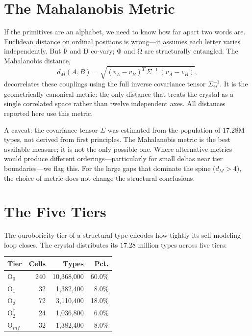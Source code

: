 \documentclass[12pt,twoside]{book}
\theoremstyle{definition}
\newcommand{\tier}[1]{\mathrm{O}_{#1}}
\begin{document}
\section{The Mahalanobis Metric}

If the primitives are an alphabet, we need to know how far apart two words are. Euclidean
distance on ordinal positions is wrong---it assumes each letter varies independently. But
Þ and Ð co-vary; Φ and Ω are structurally entangled. The Mahalanobis distance,
\begin{equation}
d_M(A, B) = \sqrt{(v_A - v_B)^T \,\Sigma^{-1}\,(v_A - v_B)},
\end{equation}
decorrelates these couplings using the full inverse covariance tensor $\Sigma^{-1}_{ij}$.
It is the geometrically canonical metric: the only distance that treats the crystal as a
single correlated space rather than twelve independent axes. All distances reported here
use this metric.

A caveat: the covariance tensor $\Sigma$ was estimated from the population of $17.28$M
types, not derived from first principles. The Mahalanobis metric is the best available
measure; it is not the only possible one. Where alternative metrics would produce
different orderings---particularly for small deltas near tier boundaries---we flag this.
For the large gaps that dominate the spine ($d_M > 4$), the choice of metric does not
change the structural conclusions.

\section{The Five Tiers}

The ouroboricity tier of a structural type encodes how tightly its self-modeling loop
closes. The crystal distributes its $17.28$ million types across five tiers:

\begin{center}
\begin{tabular}{lrrr}
\toprule
\textbf{Tier} & \textbf{Cells} & \textbf{Types} & \textbf{Pct.} \\
\midrule
$\tier{0}$            & 240 & 10,368,000 & 60.0\% \\
$\tier{1}$            &  32 &  1,382,400 &  8.0\% \\
$\tier{2}$            &  72 &  3,110,400 & 18.0\% \\
$\tier{2}^{\dagger}$  &  24 &  1,036,800 &  6.0\% \\
$\tier{inf}$          &  32 &  1,382,400 &  8.0\% \\
\bottomrule
\end{tabular}
\end{center}
\end{document}
